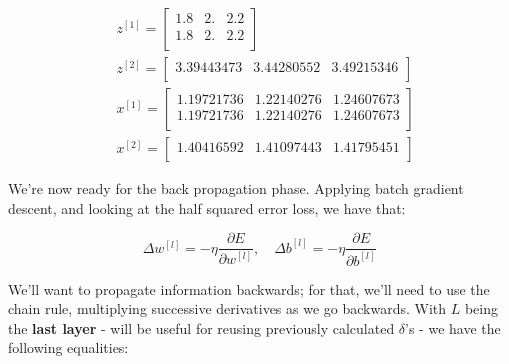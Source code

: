 \documentclass[12pt]{article}
\begin{document}
\begin{enumerate}[leftmargin=\labelsep]
        \begin{equation*}
          \begin{aligned}
            & z^{[1]} = \begin{bmatrix}
              1.8 & 2. & 2.2\\
              1.8 & 2. & 2.2\\
            \end{bmatrix} \\ & z^{[2]} = \begin{bmatrix}
                      3.39443473 & 3.44280552 & 3.49215346\\
                    \end{bmatrix}  \\
            & x^{[1]} = \begin{bmatrix}
              1.19721736 & 1.22140276 & 1.24607673\\
              1.19721736 & 1.22140276 & 1.24607673\\
            \end{bmatrix} \\ & x^{[2]} = \begin{bmatrix}
              1.40416592 & 1.41097443 & 1.41795451\\
            \end{bmatrix}
          \end{aligned}
        \end{equation*}

        We're now ready for the back propagation phase. Applying batch gradient descent,
        and looking at the half squared error loss, we have that:

        \begin{equation*}
          \Delta w^{[l]} = - \eta \frac{\partial E}{\partial w^{[l]}}, \quad
          \Delta b^{[l]} = - \eta \frac{\partial E}{\partial b^{[l]}}
        \end{equation*}

        We'll want to propagate information backwards; for that, we'll need to use
        the chain rule, multiplying successive derivatives as we go backwards.
        With $L$ being the \textbf{last layer} - will be useful for reusing previously
        calculated $\delta$'s - we have the following equalities:


\end{enumerate}
\end{document}
